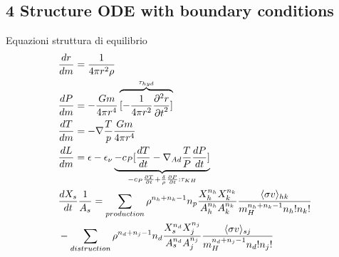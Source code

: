 \subsection{4 Structure ODE with boundary conditions}

\begin{frame}{Equazioni struttura di equilibrio}
\begin{align*}
&\TDy{m}{r}=\frac{1}{4\pi r^2\rho}\\
&\TDy{m}{P}=-\frac{Gm}{4\pi r^4}\overbrace{[-\frac{1}{4\pi r^2}\PtwoDy{t}{r}]}^{\tau_{hyd}}\\
&\TDy{m}{T}=-\nabla\frac{T}{p}\frac{Gm}{4\pi r^4}\\
&\TDy{m}{L}=\epsilon-\epsilon_{\nu} \underbrace{-c_P[\TDy{t}{T}-\nad\frac{T}{P}\TDy{t}{P}]}_{-c_P\PDy{t}{T}+\frac{\delta}{\rho}\PDy{t}{P}: \tkh}\\
&\TDy{t}{X_s}\frac{1}{A_s}=\sum_{production}\rho^{n_h+n_k-1}n_p\frac{X_h^{n_h}X_k^{n_k}}{A_h^{n_h}A_k^{n_k}}\frac{\exv{\sigma v}_{hk}}{m_H^{n_h+n_k-1}n_h!n_k!}\\
&-\sum_{distruction}\rho^{n_d+n_j-1}n_d\frac{X_s^{n_d}X_j^{n_j}}{A_s^{n_d}A_j^{n_j}}\frac{\exv{\sigma v}_{sj}}{m_H^{n_d+n_j-1}n_d!n_j!}
\end{align*}
\end{frame}

